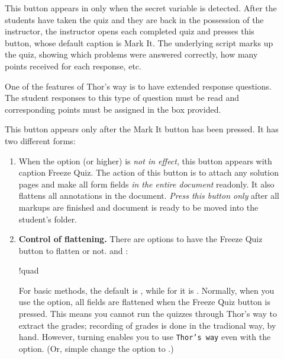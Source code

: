 \documentclass{article}
\begin{document}
\begin{description}
\item[] This button appears in  only when the
    secret variable is detected. After the students have taken the quiz and
    they are back in the possession of the instructor, the instructor opens
    each completed quiz and presses this button, whose default caption is
    \textsf{Mark It}. The underlying script marks up the quiz, showing
    which problems were answered correctly, how many points received for
    each response, etc.

    One of the features of Thor's way is to have extended response
    questions. The student responses to this type of question must be read and
    corresponding points must be assigned in the box provided.
\item[] This button appears only after the \textsf{Mark It} button has been pressed.
  It has two different forms:
  \begin{enumerate}
    \item When the  option (or higher) is \emph{not in
        effect}, this button appears with caption \textsf{Freeze Quiz}.
        The action of this button is to attach any solution pages and
        make all form fields \emph{in the entire document} readonly. It
        also flattens all annotations in the document. \emph{Press this
        button only} after all markups are finished and document is ready
        to be moved into the student's folder.

        \item[] \textbf{Control of flattening.} There are options to have the
        \textsf{Freeze Quiz} button to flatten or not.
 and :
\bVerb\takeMeasure{\string\flattenOn\quad\string\flattenOff}%
\begin{dCmd}[commandchars=!()]{\bxSize}
\flattenOn!quad\flattenOff
\end{dCmd}
\eVerb For basic methods, the default is , while for
   it is . Normally, when you use the
   option, all fields are flattened when the \textsf{Freeze
  Quiz} button is pressed. This means you cannot run the quizzes through
  \textsf{Thor's way} to extract the grades; recording of grades is done
  in the tradional way, by hand. However, turning  enables
  you to use \texttt{Thor's way} even with the  option. (Or,
  simple change the option to .)


\end{enumerate}
\end{description}
\end{document}
